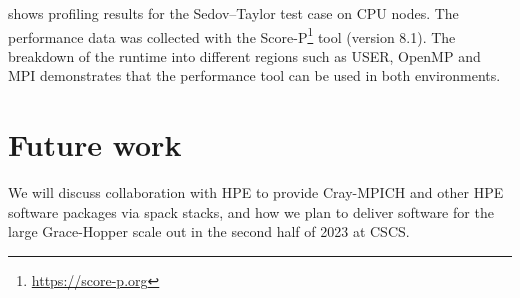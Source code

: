  shows profiling results for the Sedov--Taylor test case on CPU nodes.
The performance data was collected with the Score-P\footnote{\url{https://score-p.org}} tool (version 8.1).
The breakdown of the runtime into different regions such as USER, OpenMP and MPI demonstrates that the performance tool can be used in both environments.


\section{Future work}

We will discuss collaboration with HPE to provide Cray-MPICH and other HPE software packages via spack stacks, and how we plan to deliver software for the large Grace-Hopper scale out in the second half of 2023 at CSCS.

